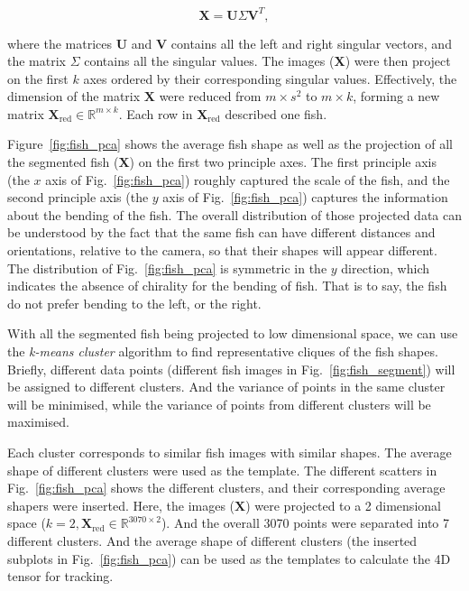\documentclass[11pt,twoside]{report}
\begin{document}
$$
\mathbf{X} = \mathbf{U} \Sigma \mathbf{V}^T,
$$

\noindent where the matrices $\mathbf{U}$ and $\mathbf{V}$ contains all the left and right singular vectors, and the matrix $\Sigma$ contains all the singular values. The images ($\mathbf{X}$) were then project on the first $k$ axes ordered by their corresponding singular values. Effectively, the dimension of the matrix $\mathbf{X}$ were reduced from $m \times s^2$ to $m \times k$, forming a new matrix $\mathbf{X}_\text{red} \in \mathbb{R}^{m \times k}$. Each row in $\mathbf{X}_\text{red}$ described one fish.



Figure~\ref{fig:fish_pca} shows the average fish shape as well as the projection of all the segmented fish ($\mathbf{X}$) on the first two principle axes. The first principle axis (the $x$ axis of Fig.~\ref{fig:fish_pca}) roughly captured the scale of the fish, and the second principle axis (the $y$ axis of Fig.~\ref{fig:fish_pca}) captures the information about the bending of the fish. 
The overall distribution of those projected data can be understood by the fact that the same fish can have different distances and orientations, relative to the camera, so that their shapes will appear different.
The distribution of Fig.~\ref{fig:fish_pca} is symmetric in the $y$ direction, which indicates the absence of chirality for the bending of fish. That is to say, the fish do not prefer bending to the left, or the right.

With all the segmented fish being projected to low dimensional space, we can use the \emph{k-means cluster} algorithm to find representative cliques of the fish shapes.
Briefly, different data points (different fish images in Fig.~\ref{fig:fish_segment}) will be assigned to different clusters. And the variance of points in the same cluster will be minimised, while the variance of points from different clusters will be maximised.

Each cluster corresponds to similar fish images with similar shapes. The average shape of different clusters were used as the template. The different scatters in Fig.~\ref{fig:fish_pca} shows the different clusters, and their corresponding average shapers were inserted. Here, the images ($\mathbf{X}$) were projected to a 2 dimensional space ($k = 2, \mathbf{X}_\text{red} \in \mathbb{R}^{3070 \times 2}$). And the overall 3070 points were separated into 7 different clusters. And the average shape of different clusters (the inserted subplots in Fig.~\ref{fig:fish_pca}) can be used as the templates to calculate the 4D tensor for tracking.
\end{document}
